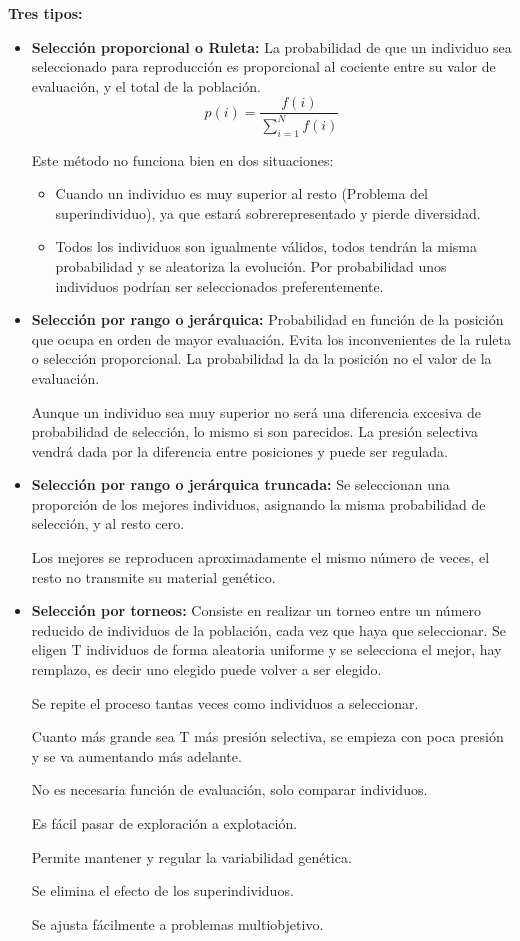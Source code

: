 \documentclass[12pt, twoside, openright]{report} %
\begin{document}
\textbf{Tres tipos:}
\begin{itemize}
	\item \textbf{Selección proporcional o Ruleta:} La probabilidad de que un individuo sea seleccionado para reproducción es proporcional al cociente entre su valor de evaluación, y el total de la población.
	      $$p(i)=\frac{f(i)}{\sum^N_{i=1} f(i)}$$
	      \pagebreak

	      Este método no funciona bien en dos situaciones:
	      \begin{itemize}
		      \item Cuando un individuo es muy superior al resto (Problema del superindividuo), ya que estará sobrerepresentado y pierde diversidad.
		      \item Todos los individuos son igualmente válidos, todos tendrán la misma probabilidad y se aleatoriza la evolución. Por probabilidad unos individuos podrían ser seleccionados preferentemente.
	      \end{itemize}
	\item \textbf{Selección por rango o jerárquica:} Probabilidad en función de la posición que ocupa en orden de mayor evaluación. Evita los inconvenientes de la ruleta o selección proporcional. La probabilidad la da la posición no el valor de la evaluación.

	      Aunque un individuo sea muy superior no será una diferencia excesiva de probabilidad de selección, lo mismo si son parecidos. La presión selectiva vendrá dada por la diferencia entre posiciones y puede ser regulada.
	\item \textbf{Selección por rango o jerárquica truncada:} Se seleccionan una proporción de los mejores individuos, asignando la misma probabilidad de selección, y al resto cero.

	      Los mejores se reproducen aproximadamente el mismo número de veces, el resto no transmite su material genético.
	\item \textbf{Selección por torneos:} Consiste en realizar un torneo entre un número reducido de
	      individuos de la población, cada vez que haya que seleccionar. Se eligen T individuos de forma aleatoria uniforme y se selecciona el mejor, hay remplazo, es decir uno elegido puede volver a ser elegido.

	      Se repite el proceso tantas veces como individuos a seleccionar.

	      Cuanto más grande sea T más presión selectiva, se empieza con poca presión y se va aumentando más adelante.

	      No es necesaria función de evaluación, solo comparar individuos.

	      Es fácil pasar de exploración a explotación.

	      Permite mantener y regular la variabilidad genética.

	      Se elimina el efecto de los superindividuos.

	      Se ajusta fácilmente a problemas multiobjetivo.
\end{itemize}
\pagebreak
\end{document}
